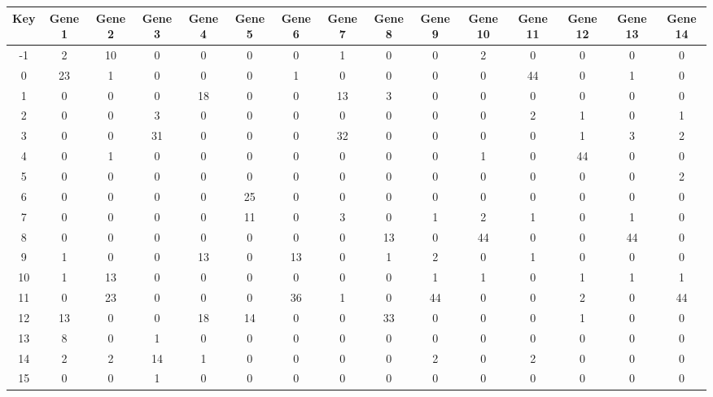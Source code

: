 \begin{tabular}{|c|c|c|c|c|c|c|c|c|c|c|c|c|c|c|}
\hline
Key & Gene 1 & Gene 2 & Gene 3 & Gene 4 & Gene 5 & Gene 6 & Gene 7 & Gene 8 & Gene 9 & Gene 10 & Gene 11 & Gene 12 & Gene 13 & Gene 14 \\
\hline
-1 & 2 & 10 & 0 & 0 & 0 & 0 & 1 & 0 & 0 & 2 & 0 & 0 & 0 & 0 \\
0 & 23 & 1 & 0 & 0 & 0 & 1 & 0 & 0 & 0 & 0 & 44 & 0 & 1 & 0 \\
1 & 0 & 0 & 0 & 18 & 0 & 0 & 13 & 3 & 0 & 0 & 0 & 0 & 0 & 0 \\
2 & 0 & 0 & 3 & 0 & 0 & 0 & 0 & 0 & 0 & 0 & 2 & 1 & 0 & 1 \\
3 & 0 & 0 & 31 & 0 & 0 & 0 & 32 & 0 & 0 & 0 & 0 & 1 & 3 & 2 \\
4 & 0 & 1 & 0 & 0 & 0 & 0 & 0 & 0 & 0 & 1 & 0 & 44 & 0 & 0 \\
5 & 0 & 0 & 0 & 0 & 0 & 0 & 0 & 0 & 0 & 0 & 0 & 0 & 0 & 2 \\
6 & 0 & 0 & 0 & 0 & 25 & 0 & 0 & 0 & 0 & 0 & 0 & 0 & 0 & 0 \\
7 & 0 & 0 & 0 & 0 & 11 & 0 & 3 & 0 & 1 & 2 & 1 & 0 & 1 & 0 \\
8 & 0 & 0 & 0 & 0 & 0 & 0 & 0 & 13 & 0 & 44 & 0 & 0 & 44 & 0 \\
9 & 1 & 0 & 0 & 13 & 0 & 13 & 0 & 1 & 2 & 0 & 1 & 0 & 0 & 0 \\
10 & 1 & 13 & 0 & 0 & 0 & 0 & 0 & 0 & 1 & 1 & 0 & 1 & 1 & 1 \\
11 & 0 & 23 & 0 & 0 & 0 & 36 & 1 & 0 & 44 & 0 & 0 & 2 & 0 & 44 \\
12 & 13 & 0 & 0 & 18 & 14 & 0 & 0 & 33 & 0 & 0 & 0 & 1 & 0 & 0 \\
13 & 8 & 0 & 1 & 0 & 0 & 0 & 0 & 0 & 0 & 0 & 0 & 0 & 0 & 0 \\
14 & 2 & 2 & 14 & 1 & 0 & 0 & 0 & 0 & 2 & 0 & 2 & 0 & 0 & 0 \\
15 & 0 & 0 & 1 & 0 & 0 & 0 & 0 & 0 & 0 & 0 & 0 & 0 & 0 & 0 \\
\hline
\end{tabular}
